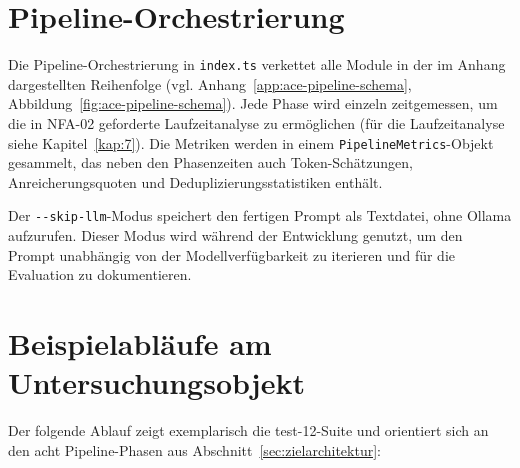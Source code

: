 \section{Pipeline-Orchestrierung}
\label{sec:impl-pipeline}

Die Pipeline-Orchestrierung in \texttt{index.ts} verkettet alle Module in der im Anhang dargestellten Reihenfolge (vgl. Anhang~\ref{app:ace-pipeline-schema}, Abbildung~\ref{fig:ace-pipeline-schema}). Jede Phase wird einzeln zeitgemessen, um die in \ac{NFA}-02 geforderte Laufzeitanalyse zu ermöglichen (für die Laufzeitanalyse siehe Kapitel~\ref{kap:7}). Die Metriken werden in einem \texttt{PipelineMetrics}-Objekt gesammelt, das neben den Phasenzeiten auch Token-Schätzungen, Anreicherungsquoten und Deduplizierungsstatistiken enthält.

Der \texttt{-{}-skip-llm}-Modus speichert den fertigen Prompt als Textdatei, ohne Ollama aufzurufen. Dieser Modus wird während der Entwicklung genutzt, um den Prompt unabhängig von der Modellverfügbarkeit zu iterieren und für die Evaluation zu dokumentieren.

\section{Beispielabläufe am Untersuchungsobjekt}
\label{sec:beispielablaeufe}

Der folgende Ablauf zeigt exemplarisch die test-12-Suite und orientiert sich an den acht Pipeline-Phasen aus Abschnitt~\ref{sec:zielarchitektur}:

